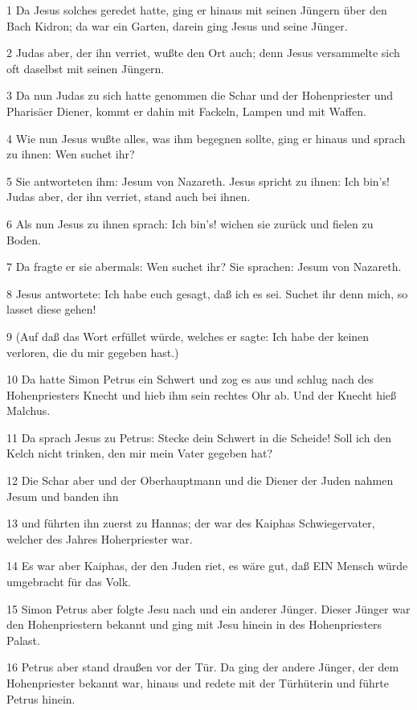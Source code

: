 \par 1 Da Jesus solches geredet hatte, ging er hinaus mit seinen Jüngern über den Bach Kidron; da war ein Garten, darein ging Jesus und seine Jünger.
\par 2 Judas aber, der ihn verriet, wußte den Ort auch; denn Jesus versammelte sich oft daselbst mit seinen Jüngern.
\par 3 Da nun Judas zu sich hatte genommen die Schar und der Hohenpriester und Pharisäer Diener, kommt er dahin mit Fackeln, Lampen und mit Waffen.
\par 4 Wie nun Jesus wußte alles, was ihm begegnen sollte, ging er hinaus und sprach zu ihnen: Wen suchet ihr?
\par 5 Sie antworteten ihm: Jesum von Nazareth. Jesus spricht zu ihnen: Ich bin's! Judas aber, der ihn verriet, stand auch bei ihnen.
\par 6 Als nun Jesus zu ihnen sprach: Ich bin's! wichen sie zurück und fielen zu Boden.
\par 7 Da fragte er sie abermals: Wen suchet ihr? Sie sprachen: Jesum von Nazareth.
\par 8 Jesus antwortete: Ich habe euch gesagt, daß ich es sei. Suchet ihr denn mich, so lasset diese gehen!
\par 9 (Auf daß das Wort erfüllet würde, welches er sagte: Ich habe der keinen verloren, die du mir gegeben hast.)
\par 10 Da hatte Simon Petrus ein Schwert und zog es aus und schlug nach des Hohenpriesters Knecht und hieb ihm sein rechtes Ohr ab. Und der Knecht hieß Malchus.
\par 11 Da sprach Jesus zu Petrus: Stecke dein Schwert in die Scheide! Soll ich den Kelch nicht trinken, den mir mein Vater gegeben hat?
\par 12 Die Schar aber und der Oberhauptmann und die Diener der Juden nahmen Jesum und banden ihn
\par 13 und führten ihn zuerst zu Hannas; der war des Kaiphas Schwiegervater, welcher des Jahres Hoherpriester war.
\par 14 Es war aber Kaiphas, der den Juden riet, es wäre gut, daß EIN Mensch würde umgebracht für das Volk.
\par 15 Simon Petrus aber folgte Jesu nach und ein anderer Jünger. Dieser Jünger war den Hohenpriestern bekannt und ging mit Jesu hinein in des Hohenpriesters Palast.
\par 16 Petrus aber stand draußen vor der Tür. Da ging der andere Jünger, der dem Hohenpriester bekannt war, hinaus und redete mit der Türhüterin und führte Petrus hinein.
